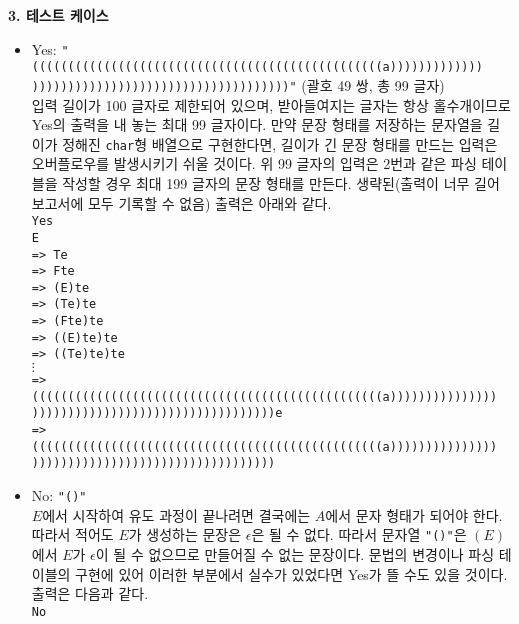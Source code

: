 \documentclass[12pt]{article}
\begin{document}
\noindent\textbf{3. 테스트 케이스}\\
\begin{itemize}[nolistsep]
	\item Yes: \texttt{"(((((((((((((((((((((((((((((((((((((((((((((((((a)))))))))))))\\))))))))))))))))))))))))))))))))))))"} (괄호 49 쌍, 총 99 글자)\\
	
	입력 길이가 100 글자로 제한되어 있으며, 받아들여지는 글자는 항상 홀수개이므로 Yes의 출력을 내 놓는 최대 99 글자이다. 만약 문장 형태를 저장하는 문자열을 길이가 정해진 \texttt{char}형 배열으로 구현한다면, 길이가 긴 문장 형태를 만드는 입력은 오버플로우를 발생시키기 쉬울 것이다. 위 99 글자의 입력은 2번과 같은 파싱 테이블을 작성할 경우 최대 199 글자의 문장 형태를 만든다. 생략된(출력이 너무 길어 보고서에 모두 기록할 수 없음) 출력은 아래와 같다.\\
	
	\texttt{Yes\\
	E\\
	=> Te\\
	=> Fte\\
	=> (E)te\\
	=> (Te)te\\
	=> (Fte)te\\
	=> ((E)te)te\\
	=> ((Te)te)te\\
	$\vdots$\\
	=> (((((((((((((((((((((((((((((((((((((((((((((((((a)))))))))))))))\\))))))))))))))))))))))))))))))))))e\\
	=> (((((((((((((((((((((((((((((((((((((((((((((((((a)))))))))))))))\\))))))))))))))))))))))))))))))))))\\
	}
	\vspace{0.3cm}
	
	\item No: \texttt{"()"}\\
	
	$E$에서 시작하여 유도 과정이 끝나려면 결국에는 $A$에서 문자 형태가 되어야 한다. 따라서 적어도 $E$가 생성하는 문장은 $\epsilon$은 될 수 없다. 따라서 문자열 \texttt{"()"}은 $(E)$에서 $E$가 $\epsilon$이 될 수 없으므로 만들어질 수 없는 문장이다. 문법의 변경이나 파싱 테이블의 구현에 있어 이러한 부분에서 실수가 있었다면 Yes가 뜰 수도 있을 것이다. 출력은 다음과 같다.\\
	
	\texttt{No}
	
\end{itemize}
\end{document}
